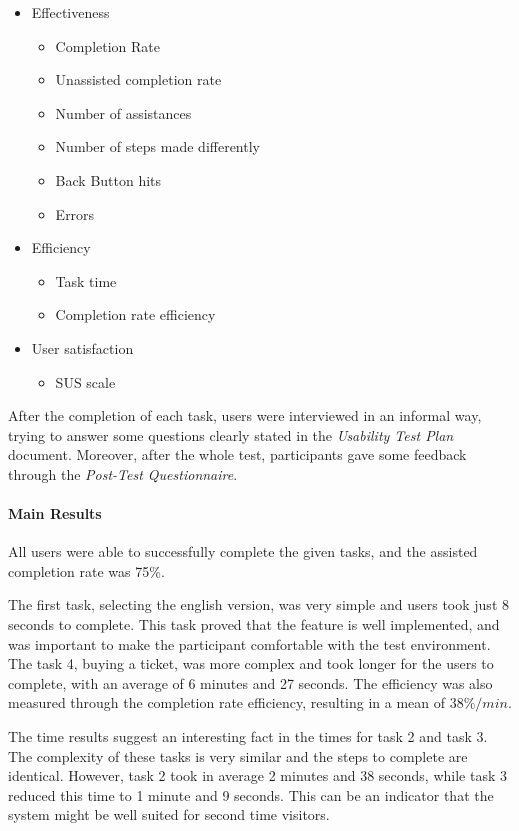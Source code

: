 \documentclass[a4paper]{article}
\begin{document}
 \begin{itemize}
   \item Effectiveness
   \begin{itemize}
     \item Completion Rate
     \item Unassisted completion rate
     \item Number of assistances
     \item Number of steps made differently
     \item Back Button hits
     \item Errors
   \end{itemize}
   \item Efficiency
   \begin{itemize}
     \item Task time
     \item Completion rate efficiency
   \end{itemize}
   \item User satisfaction
   \begin{itemize}
     \item SUS scale
   \end{itemize}
 \end{itemize}
 
 After the completion of each task, users were interviewed in an informal way, trying to answer some questions clearly stated in the \emph{Usability Test Plan} document. Moreover, after the whole test, participants gave some feedback through the \emph{Post-Test Questionnaire}.
 
 
 \paragraph{Main Results}
All users were able to successfully complete the given tasks, and the assisted completion rate was 75\%.

The first task, selecting the english version, was very simple and users took just 8 seconds to complete. This task proved that the feature is well implemented, and was important to make the participant comfortable with the test environment. The task 4, buying a ticket, was more complex and took longer for the users to complete, with an average of 6 minutes and 27 seconds. The efficiency was also measured through the completion rate efficiency, resulting in a mean of $38\%/min$.

The time results suggest an interesting fact in the times for task 2 and task 3. The complexity of these tasks is very similar and the steps to complete are identical. However, task 2 took in average 2 minutes and 38 seconds, while task 3 reduced this time to 1 minute and 9 seconds. This can be an indicator that the system might be well suited for second time visitors.
\end{document}
